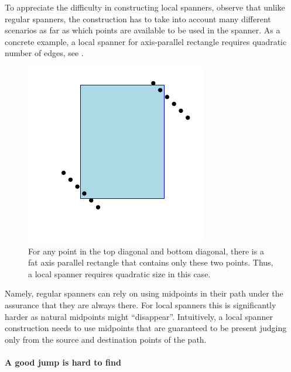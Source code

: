 To appreciate the difficulty in constructing local spanners, observe
that unlike regular spanners, the construction has to take into
account many different scenarios as far as which points are available
to be used in the spanner. As a concrete example, a local spanner for
axis-parallel rectangle requires quadratic number of edges, see
.

\begin{figure}[h]
    \centerline{\includegraphics{figs/local_rectangles}}
    \caption{For any point in the top diagonal and bottom diagonal,
       there is a fat axis parallel rectangle that contains only these
       two points. Thus, a local spanner requires quadratic size in
       this case.  }
\end{figure}

Namely, regular spanners can rely on using midpoints in their path
under the assurance that they are always there. For local spanners
this is significantly harder as natural midpoints might
``disappear''. Intuitively, a local spanner construction needs to use
midpoints that are guaranteed to be present judging only from the
source and destination points of the path.

\paragraph*{A good jump is hard to find}

